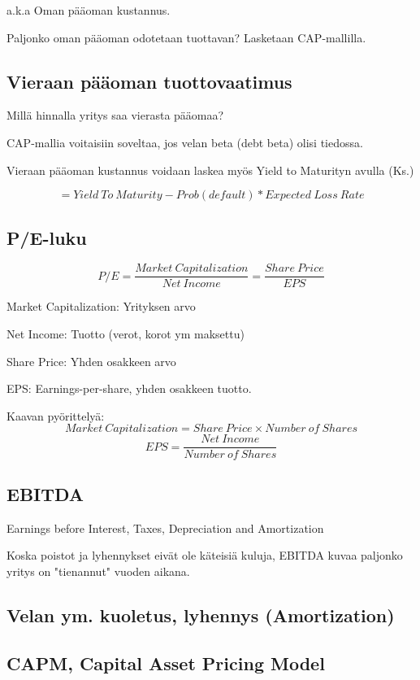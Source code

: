 \documentclass[a4paper]{article}
\begin{document}
a.k.a Oman pääoman kustannus.

Paljonko oman pääoman odotetaan tuottavan? Lasketaan CAP-mallilla.

\subsection{Vieraan pääoman tuottovaatimus}

Millä hinnalla yritys saa vierasta pääomaa?

CAP-mallia voitaisiin soveltaa, jos velan beta (debt beta) olisi tiedossa.

Vieraan pääoman kustannus voidaan laskea myös Yield to Maturityn avulla (Ks.)

\[
    = Yield\ To\ Maturity - Prob(default) * Expected\ Loss\ Rate
\]

\subsection{P/E-luku}

\[
    P/E = \frac{Market\ Capitalization}{Net\ Income} = \frac{Share\ Price}{EPS}
\]

Market Capitalization: Yrityksen arvo

Net Income: Tuotto (verot, korot ym maksettu)

Share Price: Yhden osakkeen arvo

EPS: Earnings-per-share, yhden osakkeen tuotto.

Kaavan pyörittelyä: 
\[
    Market\ Capitalization = Share\ Price \times Number\ of\ Shares
\]
\[
    EPS = \frac{Net\ Income}{Number\ of\ Shares} 
\]

\subsection{EBITDA}

Earnings before Interest, Taxes, Depreciation and Amortization

Koska poistot ja lyhennykset eivät ole käteisiä kuluja, EBITDA kuvaa paljonko yritys on "tienannut" vuoden aikana.

\subsection{Velan ym. kuoletus, lyhennys (Amortization)}



\subsection{CAPM, Capital Asset Pricing Model}
\end{document}
